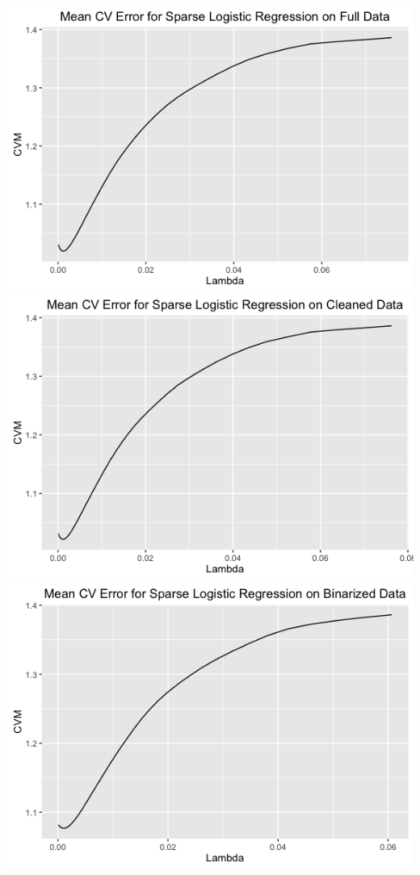 \documentclass{article}
\begin{document}
\centerline{\includegraphics[scale=.3]{diagrams/1logreg.png}\includegraphics[scale=.3]{diagrams/2logreg.png}\includegraphics[scale=.3]{diagrams/3logreg.png}}
\end{document}
